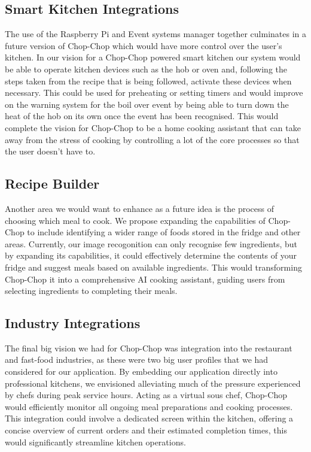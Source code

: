 \documentclass{article}
\begin{document}
\subsection{Smart Kitchen Integrations}
The use of the Raspberry Pi and Event systems manager together culminates in a future version of Chop-Chop which would have more control over the user’s kitchen. In our vision for a Chop-Chop powered smart kitchen our system would be able to operate kitchen devices such as the hob or oven and, following the steps taken from the recipe that is being followed, activate these devices when necessary. This could be used for preheating or setting timers and would improve on the warning system for the boil over event by being able to turn down the heat of the hob on its own once the event has been recognised. This would complete the vision for Chop-Chop to be a home cooking assistant that can take away from the stress of cooking by controlling a lot of the core processes so that the user doesn’t have to.
\subsection{Recipe Builder}
Another area we would want to enhance as a future idea is the process of choosing which meal to cook. We propose expanding the capabilities of Chop-Chop to include identifying a wider range of foods stored in the fridge and other areas. Currently, our image recogonition can only recognise few ingredients, but by expanding its capabilities, it could effectively determine the contents of your fridge and suggest meals based on available ingredients. This would transforming Chop-Chop it into a comprehensive AI cooking assistant, guiding users from selecting ingredients to completing their meals.
\subsection{Industry Integrations}
The final big vision we had for Chop-Chop was integration into the restaurant and fast-food industries, as these were two big user profiles that we had considered for our application.
By embedding our application directly into professional kitchens, we envisioned alleviating much of the pressure experienced by chefs during peak service hours. Acting as a virtual sous chef, Chop-Chop would efficiently monitor all ongoing meal preparations and cooking processes. This integration could involve a dedicated screen within the kitchen, offering a concise overview of current orders and their estimated completion times, this would significantly streamline kitchen operations.
\end{document}
